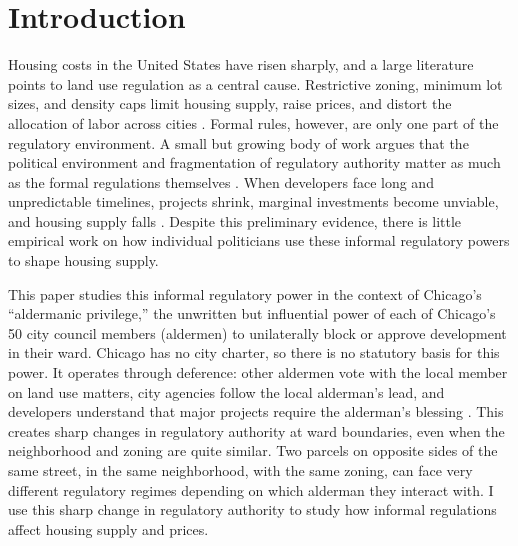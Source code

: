 
\section{Introduction}
\label{sec:intro}

Housing costs in the United States have risen sharply, and a large literature points to land use regulation as a central cause.
Restrictive zoning, minimum lot sizes, and density caps limit housing supply, raise prices, and distort the allocation of labor across cities \citep{glaeser_why_2005, saiz_geographic_2010, turner_land_2014, hsieh_housing_2019, duranton_urban_2023}.
Formal rules, however, are only one part of the regulatory environment.
A small but growing body of work argues that the political environment and fragmentation of regulatory authority matter as much as the formal regulations themselves \citep{mayer_land_2000, hilber_origins_2013, khan_decentralized_2021, mast_warding_2024, soltas_how_2026}.
When developers face long and unpredictable timelines, projects shrink, marginal investments become unviable, and housing supply falls \citep{cunningham_house_2006, bloom_impact_2009, oh_land_2024}.
Despite this preliminary evidence, there is little empirical work on how individual politicians use these informal regulatory powers to shape housing supply.

This paper studies this informal regulatory power in the context of Chicago's ``aldermanic privilege,'' the unwritten but influential power of each of Chicago's 50 city council members (aldermen) to unilaterally block or approve development in their ward.
Chicago has no city charter, so there is no statutory basis for this power.
It operates through deference: other aldermen vote with the local member on land use matters, city agencies follow the local alderman's lead, and developers understand that major projects require the alderman's blessing \citep{thale_aldermanic_2005, einstein_neighborhood_2019, khan_decentralized_2021}.
This creates sharp changes in regulatory authority at ward boundaries, even when the neighborhood and zoning are quite similar.
Two parcels on opposite sides of the same street, in the same neighborhood, with the same zoning, can face very different regulatory regimes depending on which alderman they interact with.
I use this sharp change in regulatory authority to study how informal regulations affect housing supply and prices.

